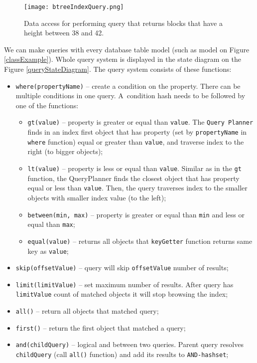 \begin{figure}[h]
    \centering
    \texttt{[image: btreeIndexQuery.png]}
    \caption{Data access for performing query that returns blocks that have a height between 38 and 42.}
    \label{btreeQuery}
\end{figure}


We can make queries with every database table model (such as model on Figure \ref{classExample}). Whole query system is displayed in the state diagram on the Figure \ref{queryStateDiagram}. The query system consists of these functions: 
\begin{itemize}
    \item \texttt{where(propertyName)} -- create a condition on the property. There can be multiple conditions in one query. A~condition hash needs to be followed by one of the functions: 
    \begin{itemize}
        \item \texttt{gt(value)} -- property is greater or equal than \texttt{value}. The \texttt{Query Planner} finds in an index first object that has property (set by \texttt{propertyName} in \texttt{where} function) equal or greater than \texttt{value}, and traverse index to the right (to bigger objects);
        \item \texttt{lt(value)} -- property is less or equal than \texttt{value}. Similar as in the \texttt{gt} function, the QueryPlanner finds the closest object that has property equal or less than \texttt{value}. Then, the query traverses index to the smaller objects with smaller index value (to the left);
        \item \texttt{between(min, max)} -- property is greater or equal than \texttt{min} and less or equal than \texttt{max};
        \item \texttt{equal(value)} -- returns all objects that \texttt{keyGetter} function returns same key as \texttt{value};
    \end{itemize}
    \item \texttt{skip(offsetValue)} -- query will skip \texttt{offsetValue} number of results;
    \item \texttt{limit(limitValue)} -- set maximum number of results. After query has \texttt{limitValue} count of matched objects it will stop browsing the index;
    \item \texttt{all()} -- return all objects that matched query;
    \item \texttt{first()} -- return the first object that matched a query;
    \item \texttt{and(childQuery)} -- logical and between two queries. Parent query resolves \texttt{childQuery} (call \texttt{all()} function) and add its results to \texttt{AND-hashset};

\end{itemize}
